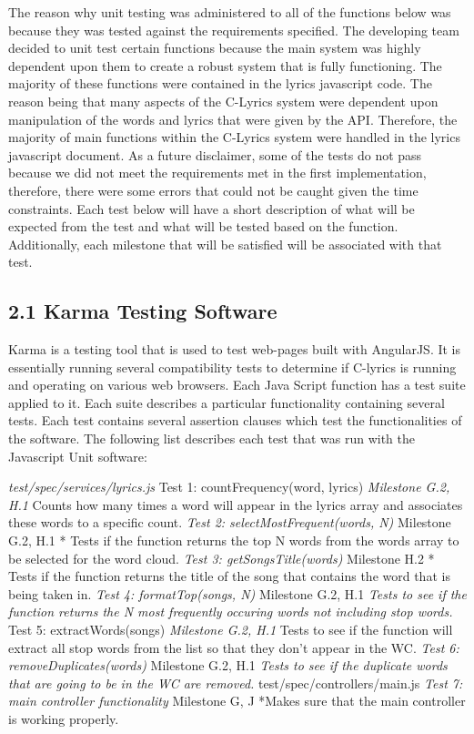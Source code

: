 \documentclass[]{article}
\begin{document}
The reason why unit testing was administered to all of the functions
below was because they was tested against the requirements specified.
The developing team decided to unit test certain functions because the
main system was highly dependent upon them to create a robust system
that is fully functioning. The majority of these functions were
contained in the lyrics javascript code. The reason being that many
aspects of the C-Lyrics system were dependent upon manipulation of the
words and lyrics that were given by the API. Therefore, the majority of
main functions within the C-Lyrics system were handled in the lyrics
javascript document. As a future disclaimer, some of the tests do not
pass because we did not meet the requirements met in the first
implementation, therefore, there were some errors that could not be
caught given the time constraints. Each test below will have a short
description of what will be expected from the test and what will be
tested based on the function. Additionally, each milestone that will be
satisfied will be associated with that test.

\subsection{2.1 Karma Testing
Software}\label{karma-testing-software}

Karma is a testing tool that is used to test web-pages built with
AngularJS. It is essentially running several compatibility tests to
determine if C-lyrics is running and operating on various web browsers.
Each Java Script function has a test suite applied to it. Each suite
describes a particular functionality containing several tests. Each test
contains several assertion clauses which test the functionalities of the
software. The following list describes each test that was run with the
Javascript Unit software:

\emph{test/spec/services/lyrics.js }Test 1: countFrequency(word, lyrics)
\emph{Milestone G.2, H.1 }Counts how many times a word will appear in
the lyrics array and associates these words to a specific count.
\emph{Test 2: selectMostFrequent(words, N) }Milestone G.2, H.1 * Tests
if the function returns the top N words from the words array to be
selected for the word cloud. \emph{Test 3: getSongsTitle(words)
}Milestone H.2 * Tests if the function returns the title of the song
that contains the word that is being taken in. \emph{Test 4:
formatTop(songs, N) }Milestone G.2, H.1 \emph{Tests to see if the
function returns the N most frequently occuring words not including stop
words. }Test 5: extractWords(songs) \emph{Milestone G.2, H.1 }Tests to
see if the function will extract all stop words from the list so that
they don't appear in the WC. \emph{Test 6: removeDuplicates(words)
}Milestone G.2, H.1 \emph{Tests to see if the duplicate words that are
going to be in the WC are removed. }test/spec/controllers/main.js
\emph{Test 7: main controller functionality }Milestone G, J *Makes sure
that the main controller is working properly.
\end{document}

